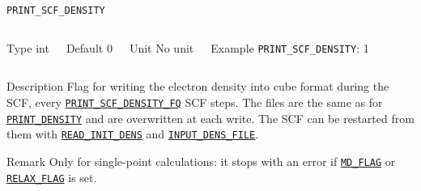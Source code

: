 \begin{frame}[allowframebreaks]{\texttt{PRINT\_SCF\_DENSITY}} \label{PRINT_SCF_DENSITY}
\vspace*{-12pt}
\begin{columns}
\begin{block}{Type}
int
\end{block}

\begin{block}{Default}
0
\end{block}

\begin{block}{Unit}
No unit
\end{block}

\begin{block}{Example}
\texttt{PRINT\_SCF\_DENSITY}: 1
\end{block}
\end{columns}

\begin{block}{Description}
Flag for writing the electron density into cube format during the SCF, every \hyperlink{PRINT_SCF_DENSITY_FQ}{\texttt{PRINT\_SCF\_DENSITY\_FQ}} SCF steps. The files are the same as for \hyperlink{PRINT_DENSITY}{\texttt{PRINT\_DENSITY}} and are overwritten at each write. The SCF can be restarted from them with \hyperlink{READ_INIT_DENS}{\texttt{READ\_INIT\_DENS}} and \hyperlink{INPUT_DENS_FILE}{\texttt{INPUT\_DENS\_FILE}}.
\end{block}

\begin{block}{Remark}
Only for single-point calculations: it stops with an error if \hyperlink{MD_FLAG}{\texttt{MD\_FLAG}} or \hyperlink{RELAX_FLAG}{\texttt{RELAX\_FLAG}} is set.
\end{block}

\end{frame}


